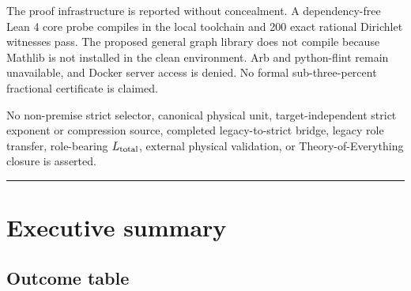 \documentclass[11pt,a4paper,openany]{report}
\begin{document}
The proof infrastructure is reported without concealment. A dependency-free Lean 4 core probe compiles in the local toolchain and 200 exact rational Dirichlet witnesses pass. The proposed general graph library does not compile because Mathlib is not installed in the clean environment. Arb and python-flint remain unavailable, and Docker server access is denied. No formal sub-three-percent fractional certificate is claimed.

No non-premise strict selector, canonical physical unit, target-independent strict exponent or compression source, completed legacy-to-strict bridge, legacy role transfer, role-bearing \(L_{\rm total}\), external physical validation, or Theory-of-Everything closure is asserted.

\par\medskip\hrule\medskip

\chapter{Executive summary}

\section{Outcome table}
\end{document}
